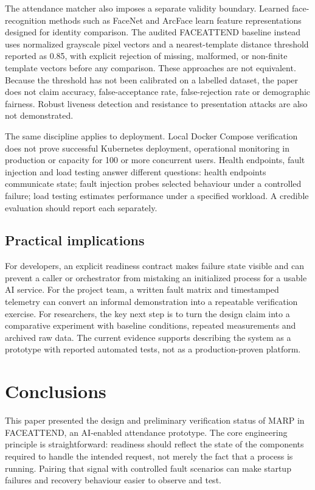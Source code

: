 \documentclass[11pt,a4paper]{article}
\begin{document}
The attendance matcher also imposes a separate validity boundary. Learned face-recognition methods such as FaceNet \cite{Schroff} and ArcFace \cite{Deng} learn feature representations designed for identity comparison. The audited FACEATTEND baseline instead uses normalized grayscale pixel vectors and a nearest-template distance threshold reported as 0.85, with explicit rejection of missing, malformed, or non-finite template vectors before any comparison. These approaches are not equivalent. Because the threshold has not been calibrated on a labelled dataset, the paper does not claim accuracy, false-acceptance rate, false-rejection rate or demographic fairness. Robust liveness detection and resistance to presentation attacks are also not demonstrated.

The same discipline applies to deployment. Local Docker Compose verification does not prove successful Kubernetes deployment, operational monitoring in production or capacity for 100 or more concurrent users. Health endpoints, fault injection and load testing answer different questions: health endpoints communicate state; fault injection probes selected behaviour under a controlled failure; load testing estimates performance under a specified workload. A credible evaluation should report each separately.

\subsection{Practical implications}

For developers, an explicit readiness contract makes failure state visible and can prevent a caller or orchestrator from mistaking an initialized process for a usable AI service. For the project team, a written fault matrix and timestamped telemetry can convert an informal demonstration into a repeatable verification exercise. For researchers, the key next step is to turn the design claim into a comparative experiment with baseline conditions, repeated measurements and archived raw data. The current evidence supports describing the system as a prototype with reported automated tests, not as a production-proven platform.

\section{Conclusions}

This paper presented the design and preliminary verification status of MARP in FACEATTEND, an AI-enabled attendance prototype. The core engineering principle is straightforward: readiness should reflect the state of the components required to handle the intended request, not merely the fact that a process is running. Pairing that signal with controlled fault scenarios can make startup failures and recovery behaviour easier to observe and test.
\end{document}
